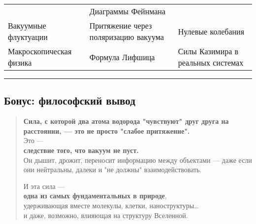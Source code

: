 \documentclass[11pt]{article}
\begin{document}
\begin{longtable}[]{@{}lll@{}}
\begin{minipage}[t]{0.13\columnwidth}
\end{minipage} & \begin{minipage}[t]{0.11\columnwidth}\raggedright\strut
Диаграммы Фейнмана\strut
\end{minipage}\tabularnewline
\begin{minipage}[t]{0.24\columnwidth}\raggedright\strut
Вакуумные флуктуации\strut
\end{minipage} & \begin{minipage}[t]{0.13\columnwidth}\raggedright\strut
Притяжение через поляризацию вакуума\strut
\end{minipage} & \begin{minipage}[t]{0.11\columnwidth}\raggedright\strut
Нулевые колебания\strut
\end{minipage}\tabularnewline
\begin{minipage}[t]{0.24\columnwidth}\raggedright\strut
Макроскопическая физика\strut
\end{minipage} & \begin{minipage}[t]{0.13\columnwidth}\raggedright\strut
Формула Лифшица\strut
\end{minipage} & \begin{minipage}[t]{0.11\columnwidth}\raggedright\strut
Силы Казимира в реальных системах\strut
\end{minipage}\tabularnewline
\bottomrule
\end{longtable}

\begin{center}\rule{0.5\linewidth}{\linethickness}\end{center}

\subsection{Бонус: философский
вывод}\label{ux431ux43eux43dux443ux441-ux444ux438ux43bux43eux441ux43eux444ux441ux43aux438ux439-ux432ux44bux432ux43eux434}

\begin{quote}
\textbf{Сила, с которой два атома водорода "чувствуют" друг друга на
расстоянии, --- это не просто "слабое притяжение".}\\
Это ---\\
\textbf{следствие того, что вакуум не пуст.}\\
Он дышит, дрожит, переносит информацию между объектами --- даже если они
нейтральны, далеки и "не должны" взаимодействовать.

И эта сила ---\\
\textbf{одна из самых фундаментальных в природе},\\
удерживающая вместе молекулы, клетки, наноструктуры\ldots{}\\
и даже, возможно, влияющая на структуру Вселенной.
\end{quote}
\end{document}
